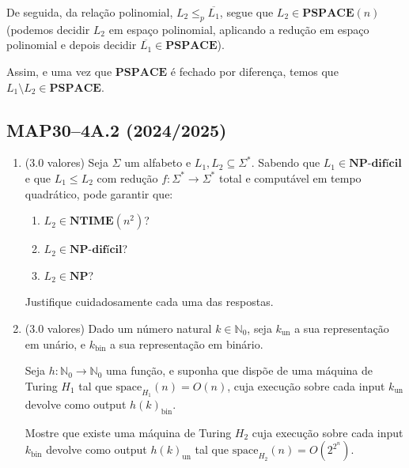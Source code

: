 \documentclass[a4paper,12pt]{article}
\begin{document}
\begin{enumerate}[label=\alph*)]
\begin{enumerate}[label=\roman*)]
    \vspace{0.3cm}
    De seguida, da relação polinomial, $L_2 \leq_p \overline{L_1}$, segue que $L_2 \in \textbf{PSPACE}(n)$ (podemos decidir $L_2$ em espaço polinomial, aplicando a redução em espaço polinomial e depois decidir $\overline{L_1} \in \textbf{PSPACE}$).

    \vspace{0.3cm}
    Assim, e uma vez que $\textbf{PSPACE}$ é fechado por diferença, temos que $L_1 \setminus L_2 \in \textbf{PSPACE}$.
    \end {enumerate}
\end {enumerate}

\vspace{1.0cm}
\subsection*{MAP30–4A.2 (2024/2025)}
\begin{enumerate}[label=\alph*)]
  \item (3.0 valores) Seja \(\Sigma\) um alfabeto e \(L_1, L_2 \subseteq \Sigma^*\). Sabendo que \(L_1 \in \textbf{NP-difícil}\) e que  
  \(L_1 \leq L_2\) com redução \(f : \Sigma^* \to \Sigma^*\) total e computável em tempo quadrático, pode garantir que:  
  
  \begin{enumerate}[label=(\roman*)]
      \item \(L_2 \in \textbf{NTIME}(n^2)\)?  
      \item \(L_2 \in \textbf{NP-difícil}\)?  
      \item \(L_2 \in \textbf{NP}\)?  
  \end{enumerate}
  
  Justifique cuidadosamente cada uma das respostas.  

  \item (3.0 valores) Dado um número natural \(k \in \mathbb{N}_0\), seja \(k_{\text{un}}\) a sua representação em unário,  
  e \(k_{\text{bin}}\) a sua representação em binário.  
  
  Seja \(h : \mathbb{N}_0 \to \mathbb{N}_0\) uma função, e suponha que dispõe de uma máquina de Turing \(H_1\) tal  
  que \(\text{space}_{H_1}(n) = O(n)\), cuja execução sobre cada input \(k_{\text{un}}\) devolve como output \(h(k)_{\text{bin}}\).  
  
  Mostre que existe uma máquina de Turing \(H_2\) cuja execução sobre cada input \(k_{\text{bin}}\) devolve  
  como output \(h(k)_{\text{un}}\) tal que \(\text{space}_{H_2}(n) = O(2^{2^n})\).  
\end{enumerate}
\end{document}
